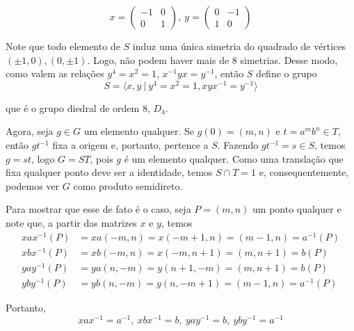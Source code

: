 	\begin{equation*}
	x = \begin{pmatrix}
	-1 & 0 \\
	0 & 1
	\end{pmatrix}, \ y = \begin{pmatrix}
	0 & -1 \\
	1 & 0 
	\end{pmatrix}
	\end{equation*} 
	\par\vspace{0.3cm} Note que todo elemento de $S$ induz uma única simetria do quadrado de vértices $(\pm1, 0), (0,\pm1)$. Logo, não podem haver mais de $8$ simetrias. Desse modo, como valem as relações $y^4=x^2=1$, $x^{-1}yx = y^{-1}$, então $S$ define o grupo
	\begin{equation*}
	S = \langle x,y \ | \ y^4=x^2=1, xyx^{-1}=y^{-1} \rangle
	\end{equation*} 
	\par\vspace{0.3cm} que é o grupo diedral de ordem $8$, $D_4$.
	\par\vspace{0.3cm} Agora, seja $g\in G$ um elemento qualquer. Se $g(0) = (m,n)$ e $t = a^mb^n\in T$, então $gt^{-1}$ fixa a origem e, portanto, pertence a $S$. Fazendo $gt^{-1} = s\in S$, temos $g = st$, logo $G = ST$, pois $g$ é um elemento qualquer. Como uma translação que fixa qualquer ponto deve ser a identidade, temos $S\cap T = 1$ e, consequentemente, podemos ver $G$ como produto semidireto.
	\par\vspace{0.3cm} Para mostrar que esse de fato é o caso, seja $P = (m,n)$ um ponto qualquer e note que, a partir das matrizes $x$ e $y$, temos
	\begin{align*}
	xax^{-1}(P) &= xa(-m,n) = x(-m+1, n) = (m-1, n) = a^{-1}(P) \\
	xbx^{-1}(P) &= xb(-m,n) = x(-m, n+1) = (m, n+1) = b(P) \\
	yay^{-1}(P) &= ya(n,-m) = y(n+1,-m) = (m, n+1) = b(P) \\
	yby^{-1}(P) &= yb(n,-m) = y(n,-m+1) = (m-1,n) = a^{-1}(P)
	\end{align*}
	\par\vspace{0.3cm} Portanto, 
	\begin{equation}
	xax^{-1} = a^{-1}, \ xbx^{-1} = b, \ yay^{-1} = b, \ yby^{-1} = a^{-1}
	\label{normaliza}
	\end{equation}
